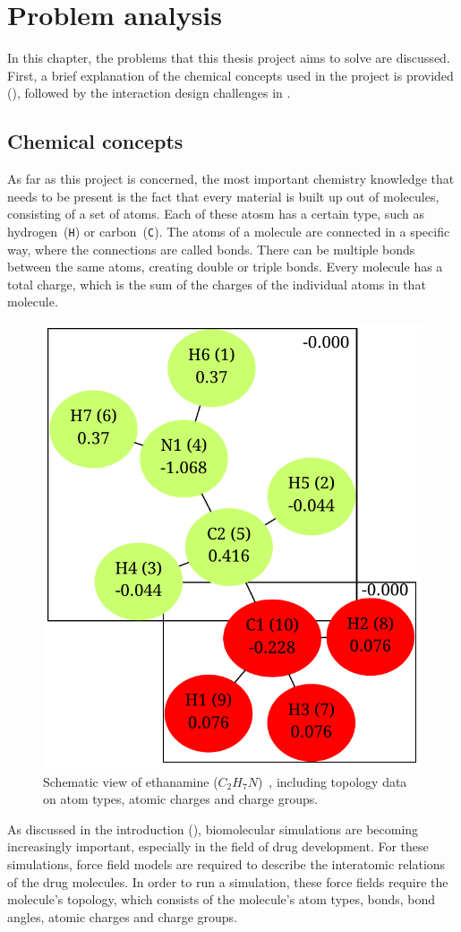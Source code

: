 \chapter{Problem analysis}

In this chapter, the problems that this thesis project aims to solve are discussed. First, a brief explanation of the chemical concepts used in the project is provided (), followed by the interaction design challenges in .

\section{Chemical concepts}
As far as this project is concerned, the most important chemistry knowledge that needs to be present is the fact that every material is built up out of molecules, consisting of a set of atoms. Each of these atosm has a certain type, such as hydrogen~(\verb|H|) or carbon~(\verb|C|). The atoms of a molecule are connected in a specific way, where the connections are called bonds. There can be multiple bonds between the same atoms, creating double or triple bonds. Every molecule has a total charge, which is the sum of the charges of the individual atoms in that molecule.

\begin{figure}
\vspace{-2em}
\begin{center}
\includegraphics[width=.38\textwidth]{img/ethanamine.pdf}
\caption{Schematic view of ethanamine ($C_{2}H_{7}N$)~\cite{atb2014ethanamine}, including topology data on atom types, atomic charges and charge groups.}
\end{center}
\vspace{-2em}
\end{figure}

As discussed in the introduction (), biomolecular simulations are becoming increasingly important, especially in the field of drug development. For these simulations, force field models are required to describe the interatomic relations of the drug molecules. In order to run a simulation, these force fields require the molecule's topology, which consists of the molecule's atom types, bonds, bond angles, atomic charges and charge groups.

